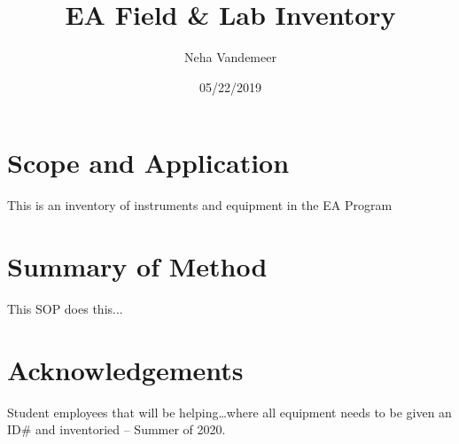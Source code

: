 \documentclass[12pt]{../SOP4_alpha}\usepackage[]{graphicx}\usepackage[]{color}
\title{EA Field \& Lab Inventory}
\date{05/22/2019}
\author{Neha Vandemeer}
\begin{document}
\maketitle

\section{Scope and Application}

\NP This is an inventory of instruments and equipment in the EA Program

\section{Summary of Method}

\NP This SOP does this...

\tableofcontents

\newpage

\section{Acknowledgements}

Student employees that will be helping\ldots where all equipment needs to be given an ID\# and inventoried -- Summer of 2020.








\end{document}

